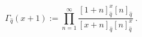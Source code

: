\begin{equation}
\Gamma _{\hat{q}}(x+1):=\prod\limits_{n=1}^{\infty }\frac{[1+n]_{\hat{q}%
}^{x}[n]_{\hat{q}}}{[x+n]_{\hat{q}}[n]_{\hat{q}}^{x}}~.\qquad  \label{gq}
\end{equation}%
